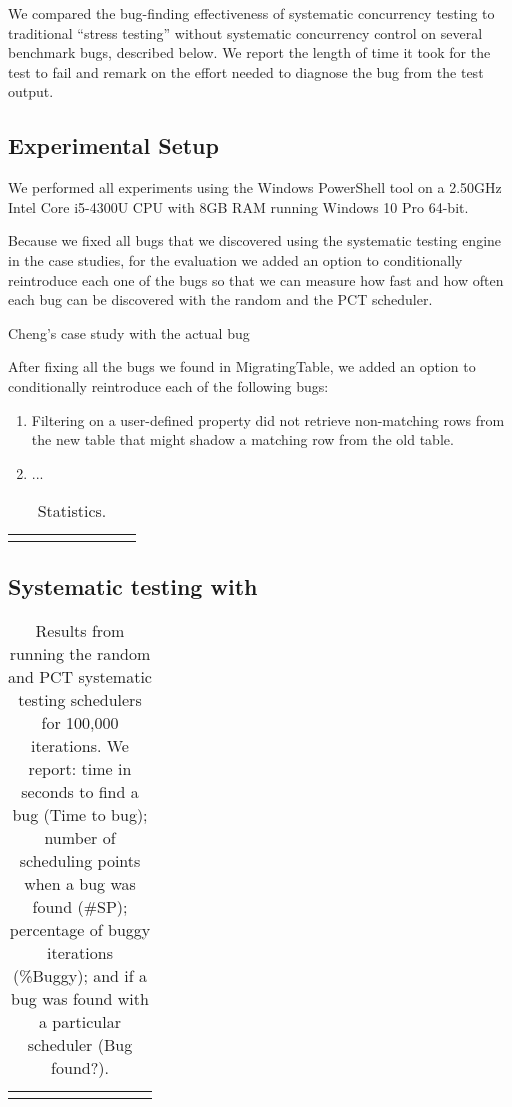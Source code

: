 We compared the bug-finding effectiveness of \psharp systematic concurrency testing to traditional ``stress testing'' without systematic concurrency control on several benchmark bugs, described below.  We report the length of time it took for the test to fail and remark on the effort needed to diagnose the bug from the test output. 

\subsection{Experimental Setup}

We performed all experiments using the Windows PowerShell tool on a 2.50GHz Intel Core i5-4300U CPU with 8GB RAM running Windows 10 Pro 64-bit.

Because we fixed all bugs that we discovered using the \psharp systematic testing engine in the case studies, for the evaluation we added an option to conditionally reintroduce each one of the bugs so that we can measure how fast and how often each bug can be discovered with the \psharp random and the PCT scheduler.

Cheng's case study with the actual bug

After fixing all the bugs we found in MigratingTable, we added an option to conditionally reintroduce each of the following bugs:
\begin{enumerate}
\item Filtering on a user-defined property did not retrieve non-matching rows from the new table that might shadow a matching row from the old table.
\item ...
\end{enumerate}

\newcommand{\colspacing}{\hspace{1.8em}}
\begin{table}[t]
\small
\centering
\setlength{\tabcolsep}{0.3em}
\label{tab:stats}
\begin{tabular}{l rrrrr rr}
\centering

\end{tabular}
\caption{Statistics.}
\end{table}

\subsection{Systematic testing with \psharp}

\setlength{\tabcolsep}{.52em}
\begin{table*}[t]
\small
\centering
\begin{tabular}{l rrrr rrrr}
\centering

\end{tabular}
\caption{Results from running the \psharp random and PCT systematic testing schedulers for 100,000 iterations. We report: time in seconds to find a bug (Time to bug); number of scheduling points when a bug was found (\#SP); percentage of buggy iterations (\%Buggy); and if a bug was found with a particular scheduler (Bug found?).}
\label{tab:testing}
\end{table*}

